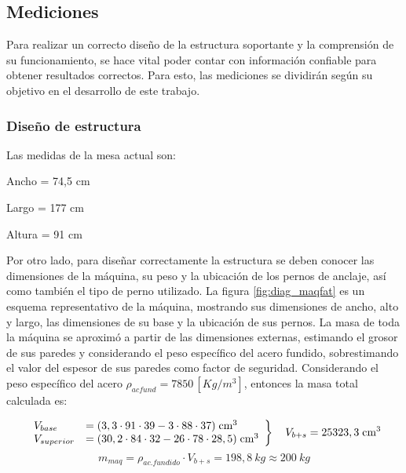 \subsection{Mediciones}
Para realizar un correcto diseño de la estructura soportante y la comprensión de su funcionamiento, se hace vital poder contar con información confiable para obtener resultados correctos. Para esto, las mediciones se dividirán según su objetivo en el desarrollo de este trabajo.
\subsubsection{Diseño de estructura}
Las medidas de la mesa actual son: 
\begin{itemize*}
	\item Ancho = 74,5 cm
	\item Largo = 177 cm
	\item Altura = 91 cm
\end{itemize*}
Por otro lado, para diseñar correctamente la estructura se deben conocer las dimensiones de la máquina, su peso y la ubicación de los pernos de anclaje, así como también el tipo de perno utilizado. La figura \ref{fig:diag_maqfat} es un esquema representativo de la máquina, mostrando sus dimensiones de ancho, alto y largo, las dimensiones de su base y la ubicación de sus pernos. La masa de toda la máquina se aproximó a partir de las dimensiones externas, estimando el grosor de sus paredes y considerando el peso específico del acero fundido, sobrestimando el valor del espesor de sus paredes como factor de seguridad. Considerando el peso específico del acero $\rho_{acfund} = 7850 \, [Kg/m^3]$, entonces la masa total calculada es:

\[ \left. 
\begin{array}{ll}
V_{base} &= (3,3\cdot 91\cdot 39 - 3\cdot 88\cdot 37)\; \text{cm}^3	\\
V_{superior} &=(30,2\cdot 84\cdot 32 - 26\cdot 78\cdot 28,5) \; \text{cm}^3	\\
\end{array}
\right\} \\
\quad V_{b+s} = 25323,3 \; \text{cm}^3 \]
\begin{equation}\label{eq:masa_maq}
	m_{maq} = \rho_{ac. fundido} \cdot V_{b+s} = 198,8 \: kg \approx 200 \: kg
\end{equation}

